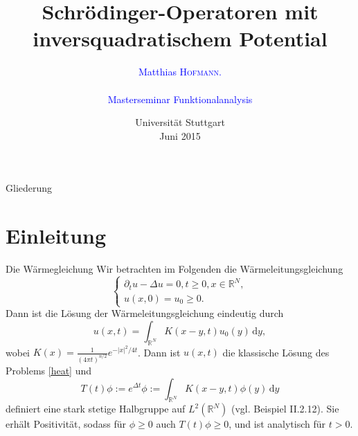 \documentclass{beamer}
\theoremstyle{break}
\begin{document}
\title[Schrödinger-Operatoren]{Schrödinger-Operatoren mit inversquadratischem Potential} 
\author[\textsc{Hofmann}]{\textcolor{blue}{Matthias \textsc{Hofmann}.\\ \ \\
Masterseminar Funktionalanalysis
}}
 \date{Universität Stuttgart\\ Juni 2015} 
 \begin{frame}
\titlepage	
\end{frame}

\begin{frame}{Gliederung}
  \tableofcontents
\end{frame}

\section{Einleitung}
\begin{frame}{Die Wärmegleichung}
Wir betrachten im Folgenden die W\"armeleitungsgleichung
\begin{equation}\label{heat}
\begin{cases}
\partial_t u - \Delta u =0, t\ge 0, x\in \mathbb R^N,\\
u(x,0)=u_0 \ge 0.
\end{cases}
\end{equation} \pause
Dann ist die L\"osung der W\"armeleitungsgleichung eindeutig durch
\begin{equation}
u(x,t)=\int_{\mathbb R^N} K(x-y, t) u_0(y) \, \mathrm dy,
\end{equation}
wobei $K(x)=\frac{1}{(4\pi t)^{n/2}} e^{-|x|^2/4t}$. \pause Dann ist $u(x,t)$ die klassische L\"osung des Problems \eqref{heat} 
und
\begin{equation}
T(t)\phi:=e^{\Delta t}\phi:=\int_{\mathbb R^N} K(x-y,t) \phi(y)\, \mathrm dy 
\end{equation}
definiert eine stark stetige Halbgruppe auf $L^2(\mathbb R^N)$ (vgl. \cite{engel-nagel} Beispiel II.2.12). Sie erh\"alt Positivit\"at, sodass f\"ur $\phi \ge 0$ auch $T(t) \phi \ge 0$, und ist analytisch f\"ur $t>0$.
\end{frame}
\end{document}

